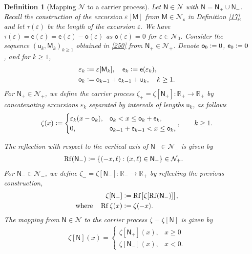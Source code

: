 \documentclass[12pt]{article}
\numberwithin{equation}{section}
\newtheorem{definition}[theorem]{Definition}
\newcommand{\RR}{\mathbb R}
\newcommand{\cN}{\mathcal N}
\newcommand{\sM}{\mathsf{M}}
\newcommand{\sN}{\mathsf{N}}
\newcommand{\se}{{\mathsf{e}}}
\newcommand{\so}{{\mathsf{o}}}
\newcommand{\su}{{\mathsf{u}}}
\newcommand{\vep}{\varepsilon}
\DeclareMathOperator{\Reflect}{Rf}
\begin{document}
\begin{definition}
  [Mapping  $\cN$ to a carrier process]\label{d8}\rm
Let $\sN\in\cN$ with $\sN=\sN_+\cup \sN_-$. Recall the construction of the excursion $\vep[\sM]$ from $\sM\in\cN_o$ in Definition \ref{17}, and let 
$\tau(\vep)$ be the length of the excursion $\vep$. We have $\tau(\vep)=\se(\vep)=\se(\vep)-\so(\vep)$ as $\so(\vep)=0$ for $\vep \in \cN_0$. Consider the sequence $(\su_k,\sM_k)_{k\ge1}$ obtained in \eqref{250} from $\sN_+\in\cN_+$. Denote $\so_0\vcentcolon =0$, $\se_0\vcentcolon =0$, and for $k\ge1$, 
\begin{align}
 \vep_k&\vcentcolon =\vep[\sM_k], \quad \se_k\vcentcolon =\se(\vep_k),\label{vep3}\\
 \so_k&\vcentcolon = \so_{k-1}+ \se_{k-1}+ \su_k, \quad k\ge1.\label{ak3}
\end{align}
For $\sN_+\in\cN_+$, we define the carrier process $\zeta_+=\zeta[\sN_+]:\RR_+\to\RR_+$ by concatenating excursions $\vep_k$ separated by intervals of lengths $\su_k$, as follows
\begin{gather}
 \label{mex1}
 \zeta(x) \vcentcolon =
 \begin{cases}
 \vep_k(x-\so_k), 
 &\so_k< x\le \so_k+\se_k, \\
  0, 
 &\so_{k-1}+\se_{k-1}< x \le \so_{k}, 
 \end{cases},\qquad k\ge1.
\end{gather}

The reflection with respect to the vertical axis of $\sN_-\in\cN_-$ is given by
\begin{align}
 \label{rfl1}
  \Reflect(\sN_-) &\vcentcolon = \{(-x, \ell):(x, \ell)\in\sN_-\} \in\cN_+.
\end{align}
For $\sN_-\in \cN_-$, we define $\zeta_-=\zeta[\sN_-]:\RR_-\to\RR_+$ by reflecting the previous construction, 
\begin{align}
 \zeta[\sN_-] &\vcentcolon = \Reflect\bigl[\zeta[\Reflect(\sN_-)]\bigr],  \label{257}
 \\
\text{where}\quad\Reflect\zeta(x)&\vcentcolon = \zeta(-x). \notag
\end{align}
The mapping from $\sN\in \cN$ to the carrier process $\zeta=\zeta[\sN]$ is given by
\begin{align}
  \label{eq:5}
  \zeta[\sN](x) =
  \begin{cases}
    \zeta[\sN_+](x),&x\ge 0\\
    \zeta[\sN_-](x),&x<0.
  \end{cases}
\end{align}
\end{definition}
\end{document}
